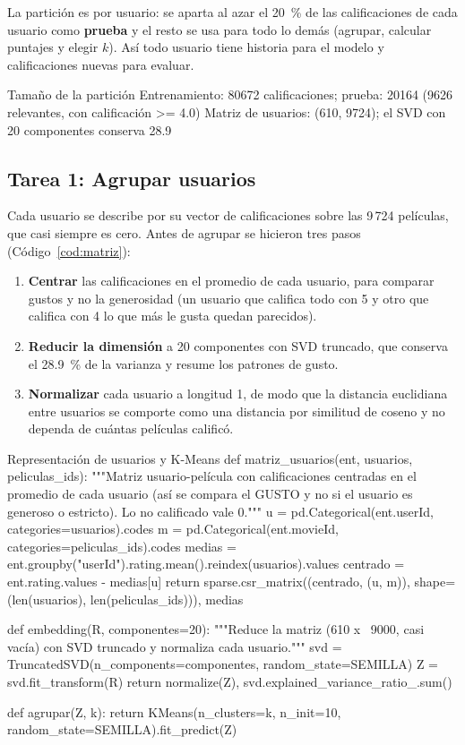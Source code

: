 \documentclass[11pt,letterpaper]{article}
\begin{document}
La partición es por usuario: se aparta al azar el 20~\% de las calificaciones de cada usuario como \textbf{prueba} y el resto se usa para todo lo demás (agrupar, calcular puntajes y elegir $k$). Así todo usuario tiene historia para el modelo y calificaciones nuevas para evaluar.

\begin{consola}[label=out:split]{Tamaño de la partición}
Entrenamiento: 80672 calificaciones; prueba: 20164 (9626 relevantes, con calificación >= 4.0)
Matriz de usuarios: (610, 9724); el SVD con 20 componentes conserva 28.9%
\end{consola}

\subsection{Tarea 1: Agrupar usuarios}

Cada usuario se describe por su vector de calificaciones sobre las 9\,724 películas, que casi siempre es cero. Antes de agrupar se hicieron tres pasos (Código~\ref{cod:matriz}):
\begin{enumerate}
    \item \textbf{Centrar} las calificaciones en el promedio de cada usuario, para comparar gustos y no la generosidad (un usuario que califica todo con 5 y otro que califica con 4 lo que más le gusta quedan parecidos).
    \item \textbf{Reducir la dimensión} a 20 componentes con SVD truncado, que conserva el 28.9~\% de la varianza y resume los patrones de gusto.
    \item \textbf{Normalizar} cada usuario a longitud 1, de modo que la distancia euclidiana entre usuarios se comporte como una distancia por similitud de coseno y no dependa de cuántas películas calificó.
\end{enumerate}

\begin{codigo}[label=cod:matriz]{Representación de usuarios y K-Means}
def matriz_usuarios(ent, usuarios, peliculas_ids):
    """Matriz usuario-película con calificaciones centradas en el promedio de cada usuario
    (así se compara el GUSTO y no si el usuario es generoso o estricto). Lo no calificado vale 0."""
    u = pd.Categorical(ent.userId, categories=usuarios).codes
    m = pd.Categorical(ent.movieId, categories=peliculas_ids).codes
    medias = ent.groupby("userId").rating.mean().reindex(usuarios).values
    centrado = ent.rating.values - medias[u]
    return sparse.csr_matrix((centrado, (u, m)), shape=(len(usuarios), len(peliculas_ids))), medias


def embedding(R, componentes=20):
    """Reduce la matriz (610 x ~9000, casi vacía) con SVD truncado y normaliza cada usuario."""
    svd = TruncatedSVD(n_components=componentes, random_state=SEMILLA)
    Z = svd.fit_transform(R)
    return normalize(Z), svd.explained_variance_ratio_.sum()


def agrupar(Z, k):
    return KMeans(n_clusters=k, n_init=10, random_state=SEMILLA).fit_predict(Z)
\end{codigo}
\end{document}

